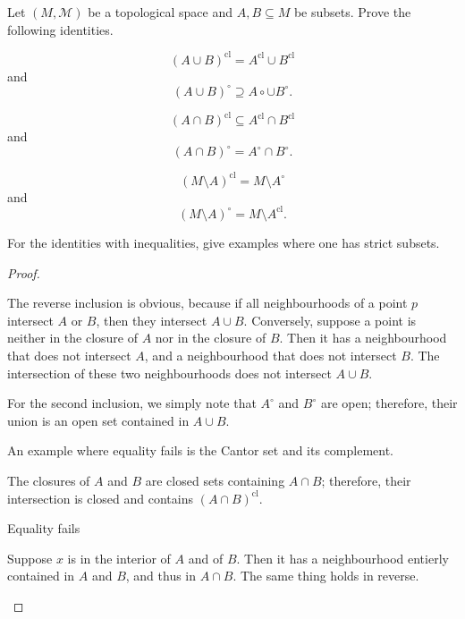 \begin{Problem}
	Let $(M, \mathcal{M})$ be a topological space and $A,B\subseteq M$ be subsets. Prove the following identities.
	\begin{parts}
	\item 
		\[
		(A\cup B)^\text{cl}=A^\text{cl}\cup B^\text{cl}
		\]
		and 
		\[
		(A\cup B)^{\circ}\supseteq A\circ \cup B^\circ
		.\] 
	\item 
		\[
		(A\cap B)^\text{cl}\subseteq A^\text{cl}\cap B^\text{cl}
		\]
		and
		\[
		(A\cap B)^\circ = A^\circ \cap B^\circ
		.\] 
	\item 
		\[
		(M\setminus A)^\text{cl}=M\setminus A^{\circ}
		\]
		and
		\[
		(M\setminus A)^\circ = M \setminus A^\text{cl}
		.\] 
	\end{parts}
	For the identities with inequalities, give examples where one has strict subsets.
\end{Problem}
\begin{proof}
	\begin{parts}
	\item The reverse inclusion is obvious, because if all neighbourhoods of a point $p$ intersect $A$ or $B$, then they intersect $A\cup B$. Conversely, suppose a point is neither in the closure of $A$ nor in the closure of $B$. Then it has a neighbourhood that does not intersect $A$, and a neighbourhood that does not intersect $B$. The intersection of these two neighbourhoods does not intersect $A\cup B$.

		For the second inclusion, we simply note that $A^\circ$ and $B^\circ$ are open; therefore, their union is an open set contained in $A\cup B$.

		An example where equality fails is the Cantor set and its complement.
	\item The closures of $A$ and $B$ are closed sets containing $A\cap B $; therefore, their intersection is closed and contains $(A\cap B)^\text{cl}$.

		Equality fails

		Suppose $x$ is in the interior of $A$ and of $B$. Then it has a neighbourhood entierly contained in $A$ and $B$, and thus in $A\cap B$. The same thing holds in reverse.
	\item 
	\end{parts}
\end{proof}

